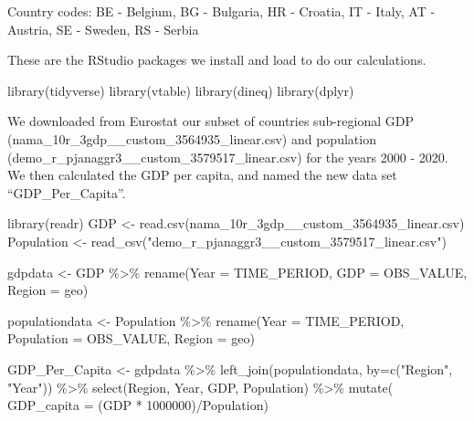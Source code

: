 \documentclass[
  a4paper,
  DIV=11,
  numbers=noendperiod]{scrartcl}
\newenvironment{Shaded}{\begin{snugshade}}{\end{snugshade}}
\newcommand{\AttributeTok}[1]{\textcolor[rgb]{0.40,0.45,0.13}{#1}}
\newcommand{\DecValTok}[1]{\textcolor[rgb]{0.68,0.00,0.00}{#1}}
\newcommand{\FunctionTok}[1]{\textcolor[rgb]{0.28,0.35,0.67}{#1}}
\newcommand{\NormalTok}[1]{\textcolor[rgb]{0.00,0.23,0.31}{#1}}
\newcommand{\OtherTok}[1]{\textcolor[rgb]{0.00,0.23,0.31}{#1}}
\newcommand{\SpecialCharTok}[1]{\textcolor[rgb]{0.37,0.37,0.37}{#1}}
\newcommand{\StringTok}[1]{\textcolor[rgb]{0.13,0.47,0.30}{#1}}
\begin{document}
Country codes: BE - Belgium, BG - Bulgaria, HR - Croatia, IT - Italy, AT
- Austria, SE - Sweden, RS - Serbia

These are the RStudio packages we install and load to do our
calculations.

\begin{Shaded}
\begin{Highlighting}[]
\FunctionTok{library}\NormalTok{(tidyverse)}
\FunctionTok{library}\NormalTok{(vtable)}
\FunctionTok{library}\NormalTok{(dineq)}
\FunctionTok{library}\NormalTok{(dplyr)}
\end{Highlighting}
\end{Shaded}

We downloaded from Eurostat our subset of countries sub-regional GDP
(nama\_10r\_3gdp\_\_custom\_3564935\_linear.csv) and population
(demo\_r\_pjanaggr3\_\_custom\_3579517\_linear.csv) for the years 2000 -
2020. We then calculated the GDP per capita, and named the new data set
``GDP\_Per\_Capita''.

\begin{Shaded}
\begin{Highlighting}[]
\FunctionTok{library}\NormalTok{(readr)}
\NormalTok{GDP }\OtherTok{\textless{}{-}} \FunctionTok{read.csv}\NormalTok{(}\StringTok{\textquotesingle{}nama\_10r\_3gdp\_\_custom\_3564935\_linear.csv\textquotesingle{}}\NormalTok{)}
\NormalTok{Population }\OtherTok{\textless{}{-}} \FunctionTok{read\_csv}\NormalTok{(}\StringTok{"demo\_r\_pjanaggr3\_\_custom\_3579517\_linear.csv"}\NormalTok{)}

\NormalTok{gdpdata }\OtherTok{\textless{}{-}}\NormalTok{ GDP }\SpecialCharTok{\%\textgreater{}\%}
  \FunctionTok{rename}\NormalTok{(}\AttributeTok{Year =}\NormalTok{ TIME\_PERIOD, }\AttributeTok{GDP =}\NormalTok{ OBS\_VALUE, }\AttributeTok{Region =}\NormalTok{ geo)}

\NormalTok{populationdata }\OtherTok{\textless{}{-}}\NormalTok{ Population }\SpecialCharTok{\%\textgreater{}\%}
  \FunctionTok{rename}\NormalTok{(}\AttributeTok{Year =}\NormalTok{ TIME\_PERIOD, }\AttributeTok{Population =}\NormalTok{ OBS\_VALUE, }\AttributeTok{Region =}\NormalTok{ geo)}

\NormalTok{GDP\_Per\_Capita }\OtherTok{\textless{}{-}}\NormalTok{ gdpdata }\SpecialCharTok{\%\textgreater{}\%}
  \FunctionTok{left\_join}\NormalTok{(populationdata, }\AttributeTok{by=}\FunctionTok{c}\NormalTok{(}\StringTok{"Region"}\NormalTok{, }\StringTok{"Year"}\NormalTok{)) }\SpecialCharTok{\%\textgreater{}\%}
  \FunctionTok{select}\NormalTok{(Region, Year, GDP, Population) }\SpecialCharTok{\%\textgreater{}\%}
  \FunctionTok{mutate}\NormalTok{(}
    \AttributeTok{GDP\_capita =}\NormalTok{ (GDP }\SpecialCharTok{*} \DecValTok{1000000}\NormalTok{)}\SpecialCharTok{/}\NormalTok{Population)}
\end{Highlighting}
\end{Shaded}
\end{document}

